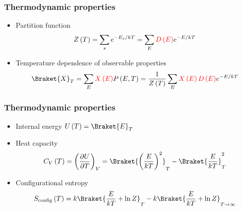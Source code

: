 \documentclass{beamer}
\newcommand{\bk}{\Braket} %
\newcommand{\p}[1]{\left(#1\right)} %
\newcommand{\f}[2]{\dfrac{#1}{#2}}
\renewcommand{\d}{\partial}
\let\olditem\item
\renewcommand{\item}{\setlength{\itemsep}{6pt}\olditem}
\begin{document}
\begin{frame}
  \frametitle{Thermodynamic properties}
  \begin{itemize}
  \item Partition function
    \begin{align*}
      Z\p{T}=\sum_se^{-E_s/kT}=\sum_E{\color{red}D\p{E}}e^{-E/kT}
    \end{align*}
  \item<2> Temperature dependence of observable properties
    \begin{align*}
      \bk{X}_T=\sum_E{\color{red} X\p{E}}P\p{E,T}
      =\f1{Z\p{T}}\sum_E{\color{red}X\p{E}D\p{E}}e^{-E/kT}
    \end{align*}
  \end{itemize}
\end{frame}

\begin{frame}
  \frametitle{Thermodynamic properties}
  \begin{itemize}
  \item Internal energy $U\p{T}=\bk{E}_T$
  \item Heat capacity
    \begin{align*}
      C_V\p{T}=\p{\f{\d U}{\d T}}_V
      =\bk{\p{\f{E}{kT}}^2}_T-\bk{\f{E}{kT}}_T^2
    \end{align*}
  \item Configurational entropy
  \begin{align*}
    S_{\text{config}}\p{T} =k\bk{\f{E}{kT}+\ln Z}_T
    -k\bk{\f{E}{kT}+\ln Z}_{T\to\infty}
  \end{align*}

  \end{itemize}
\end{frame}

\end{document}
